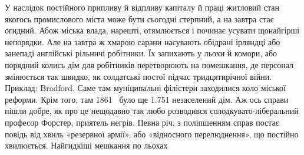 У наслідок постійного припливу й відпливу капіталу й праці
житловий стан якогось промислового міста може бути сьогодні
стерпний, а на завтра стає огидний. Абож міська влада, нарешті,
отямлюється і починає усувати щонайгірші непорядки. Але на
завтра ж хмарою сарани насувають обідрані ірляндці або занепаді
англійські рільничі робітники. Їх запихають у льохи й
комори, або порядний колись дім для робітників перетворюють
на помешкання, де персонал змінюється так швидко, як солдатські
постої підчас тридцятирічної війни. Приклад: Bradford.
Саме там муніципальні філістери заходилися коло міської реформи.
Крім того, там 1861~ було ще \num{1.751} незаселений дім.
Аж ось справи пішли добре, як про це нещодавно так любо
розводився солодкувато-ліберальний професор Форстер, приятель
негрів. Певна річ, з поліпшенням справ постає повідь
від хвиль «резервної армії», або «відносного перелюднення»,
що постійно хвилюється. Найгидкіші мешкання по льохах

